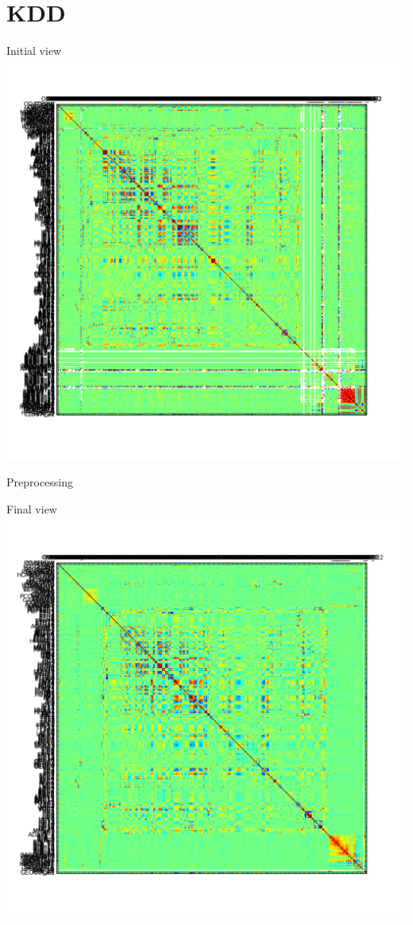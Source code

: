 \documentclass[12pt]{beamer}
\begin{document}
\section{KDD}
\begin{frame}{Initial view}
\includegraphics[height=\textheight,width=\textwidth,keepaspectratio]{plots/kdd_orig.png}
\end{frame}

\begin{frame}{Preprocessing}

\end{frame}

\begin{frame}{Final view}
\includegraphics[height=\textheight,width=\textwidth,keepaspectratio]{plots/kdd_final.png}
\end{frame}
\end{document}
